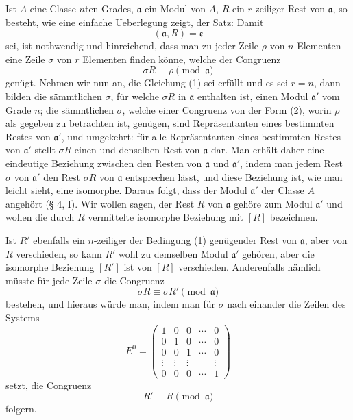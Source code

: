 \documentclass[11pt,a4paper]{article}
\begin{document}
Ist $A$ eine Classe $n$ten Grades, $\mathfrak a$ ein Modul von $A$, $R$ ein $r$-zeiliger Rest von $\mathfrak a$, so besteht, wie eine einfache Ueberlegung zeigt, der Satz: Damit
\begin{equation}
 (\mathfrak a,R)=\mathfrak e
\tag{1}
\end{equation}
sei, ist nothwendig und hinreichend, dass man zu jeder Zeile $\rho$ von $n$ Elementen eine Zeile $\sigma$ von $r$ Elementen finden könne, welche der Congruenz
\begin{equation}
 \sigma R\equiv\rho\pmod{\mathfrak a}
\tag{2}
\end{equation}
genügt. Nehmen wir nun an, die Gleichung (1) sei erfüllt und es sei $r=n$, dann bilden die sämmtlichen $\sigma$, für welche $\sigma R$ in $\mathfrak a$ enthalten ist, einen Modul $\mathfrak a'$ vom Grade $n$; die sämmtlichen $\sigma$, welche einer Congruenz von der Form (2), worin $\rho$ als gegeben zu betrachten ist, genügen, sind Repräsentanten eines bestimmten Restes von $\mathfrak a'$, und umgekehrt: für alle Repräsentanten eines bestimmten Restes von $\mathfrak a'$ stellt $\sigma R$ einen und denselben Rest von $\mathfrak a$ dar. Man erhält daher eine eindeutige Beziehung zwischen den Resten von $\mathfrak a$ und $\mathfrak a'$, indem man jedem Rest $\sigma$ von $\mathfrak a'$ den Rest $\sigma R$ von $\mathfrak a$ entsprechen lässt, und diese Beziehung ist, wie man leicht sieht, eine isomorphe. Daraus folgt, dass der Modul $\mathfrak a'$ der Classe $A$ angehört (§ 4, I). Wir wollen sagen, der Rest $R$ von $\mathfrak a$ gehöre zum Modul $\mathfrak a'$ und wollen die durch $R$ vermittelte isomorphe Beziehung mit $[R]$ bezeichnen.

Ist $R'$ ebenfalls ein $n$-zeiliger der Bedingung (1) genügender Rest von $\mathfrak a$, aber von $R$ verschieden, so kann $R'$ wohl zu demselben Modul $\mathfrak a'$ gehören, aber die isomorphe Beziehung $[R']$ ist von $[R]$ verschieden. Anderenfalls nämlich müsste für jede Zeile $\sigma$ die Congruenz
\[
 \sigma R\equiv\sigma R'\pmod{\mathfrak a}
\]
bestehen, und hieraus würde man, indem man für $\sigma$ nach einander die Zeilen des Systems
\[
 E^0=\begin{pmatrix}
 1&0&0&\cdots&0\\
 0&1&0&\cdots&0\\
 0&0&1&\cdots&0\\
 \vdots&\vdots&\vdots&&\vdots\\
 0&0&0&\cdots&1
 \end{pmatrix}
\]
setzt, die Congruenz
\[
 R'\equiv R\pmod{\mathfrak a}
\]
folgern.
\end{document}
